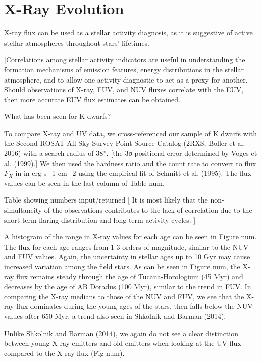 \documentclass[twocolumn]{aastex62}
\begin{document}
\section{X-Ray Evolution}

X-ray flux can be used as a stellar activity diagnosis, as it is suggestive of active stellar atmospheres throughout stars’ lifetimes. 

[Correlations among stellar activity indicators are useful in understanding the formation mechanisms of emission features, energy distributions in the stellar atmosphere, and to allow one activity diagnostic to act as a proxy for another. Should observations of X-ray, FUV, and NUV fluxes correlate with the EUV, then more accurate EUV flux estimates can be obtained.]

What has been seen for K dwarfs?

To compare X-ray and UV data, we cross-referenced our sample of K dwarfs with the Second ROSAT All-Sky Survey Point Source Catalog (2RXS, Boller et al. 2016) with a search radius of 38”, [the 3σ positional error determined by Voges et al. (1999).] We then used the hardness ratio and the count rate to convert to flux $F_X$ in  in erg s−1 cm−2 using the empirical fit of Schmitt et al. (1995). The flux values can be seen in the last column of Table num. 

Table showing numbers input/returned
[ 
It is most likely that the non-simultaneity of the observations contributes to the lack of correlation due to the short-term flaring distribution and long-term activity cycles. 
]

A histogram of the range in X-ray values for each age can be seen in Figure num. The flux for each age ranges from 1-3 orders of magnitude, similar to the NUV and FUV values. Again, the uncertainty in stellar ages up to 10 Gyr may cause increased variation among the field stars. 
As can be seen in Figure num, the X-ray flux remains steady through the age of Tucana-Horologium (45 Myr) and decreases by the age of AB Doradus (100 Myr), similar to the trend in FUV. In comparing the X-ray medians to those of the NUV and FUV, we see that the X-ray flux dominates during the young ages of the stars, then falls below the NUV values after 650 Myr, a trend also seen in Shkolnik and Barman (2014). 

Unlike Shkolnik and Barman (2014), we again do not see a clear distinction between young X-ray emitters and old emitters when looking at the UV flux compared to the X-ray flux  (Fig num). 
\end{document}
